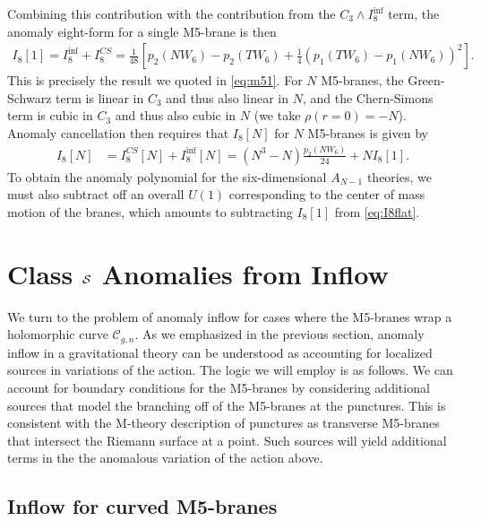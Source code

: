 \documentclass[a4paper,11pt]{article}
\newcommand{\ba}[1]{\begin{align} #1 \end{align} }
\def\CS{{\cal S}}
\begin{document}
Combining this contribution with the contribution from the $C_3\wedge I_8^{\text{inf}}$ term, the anomaly eight-form for a single M5-brane is then
	\ba{
	I_8[1]=I_8^{\text{inf}} + I_8^{CS} = \frac{1}{48} \left[ p_2(NW_6)-p_2(TW_6) + \frac{1}{4} \left( p_1(TW_6) - p_1(NW_6) \right)^2\right]. \label{eq:m52}
	}
This is precisely the result we quoted in \eqref{eq:m51}. For $N$ M5-branes, the Green-Schwarz term is linear in $C_3$ and thus also linear in $N$, and the Chern-Simons term is cubic in $C_3$ and thus also cubic in $N$ (we take $\rho(r=0)=-N$). Anomaly cancellation then requires that $I_8[N]$ for $N$ M5-branes is given by 
	\ba{
	I_8[N] &= I_8^{CS}[N] + I_8^{\text{inf}}[N]= (N^3-N) \frac{p_2(NW_6)}{24} + N I_8[1]. \label{eq:I8flat}
	}
To obtain the anomaly polynomial for the six-dimensional $A_{N-1}$ theories, we must also subtract off an overall $U(1)$ corresponding to the center of mass motion of the branes, which amounts to subtracting $I_8[1]$ from \eqref{eq:I8flat}. 



\section{Class $\CS$ Anomalies from Inflow} \label{sec:inflow2}


We turn to the problem of anomaly inflow for cases where the M5-branes wrap a holomorphic curve $\mathcal{C}_{g,n}$. 
As we emphasized in the previous section, anomaly inflow in a gravitational theory can be understood as accounting for localized sources in variations of the action. The logic we will employ is as follows.  We can account for boundary conditions for the M5-branes by considering additional sources that model the branching off of the M5-branes at the punctures. This is consistent with the M-theory description of punctures as transverse M5-branes that intersect the Riemann surface at a point. Such sources will yield additional terms in the the anomalous variation of the action above.








\subsection{Inflow for curved M5-branes}%
\end{document}
